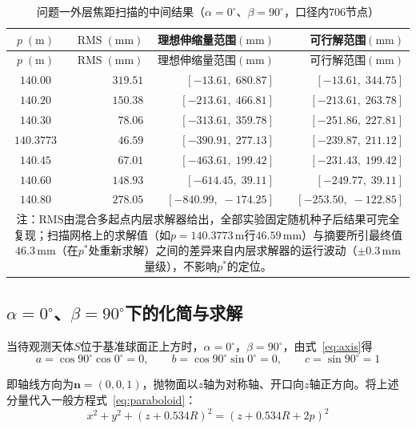 \documentclass[withoutpreface]{cumcmthesis}
\begin{document}
\begin{longtable}{c r r r}
\caption{问题一外层焦距扫描的中间结果（$\alpha=0^{\circ}$、$\beta=90^{\circ}$，口径内$706$节点）} \label{tab:p_scan} \\
\toprule
$p\;(\mathrm{m})$ & $\mathrm{RMS}\;(\mathrm{mm})$ & 理想伸缩量范围$(\mathrm{mm})$ & 可行解范围$(\mathrm{mm})$ \\
\midrule
\endfirsthead
\toprule
$p\;(\mathrm{m})$ & $\mathrm{RMS}\;(\mathrm{mm})$ & 理想伸缩量范围$(\mathrm{mm})$ & 可行解范围$(\mathrm{mm})$ \\
\midrule
\endhead
\bottomrule
\endfoot
\bottomrule
\endlastfoot
$140.00$ & $319.51$ & $[-13.61,\;680.87]$ & $[-13.61,\;344.75]$ \\
$140.20$ & $150.38$ & $[-213.61,\;466.81]$ & $[-213.61,\;263.78]$ \\
$140.30$ & $78.06$ & $[-313.61,\;359.78]$ & $[-251.86,\;227.81]$ \\
$\mathbf{140.3773}$ & $\mathbf{46.59}$ & $[-390.91,\;277.13]$ & $[-239.87,\;211.12]$ \\
$140.45$ & $67.01$ & $[-463.61,\;199.42]$ & $[-231.43,\;199.42]$ \\
$140.60$ & $148.93$ & $[-614.45,\;39.11]$ & $[-249.77,\;39.11]$ \\
$140.80$ & $278.05$ & $[-840.99,\;-174.25]$ & $[-253.50,\;-122.85]$ \\
\midrule
\multicolumn{4}{p{12.8cm}}{\small 注：$\mathrm{RMS}$由混合多起点内层求解器给出，全部实验固定随机种子后结果可完全复现；扫描网格上的求解值（如$p=140.3773\,\mathrm{m}$行$46.59\,\mathrm{mm}$）与摘要所引最终值$46.3\,\mathrm{mm}$（在$p^{*}$处重新求解）之间的差异来自内层求解器的运行波动（$\pm0.3\,\mathrm{mm}$量级），不影响$p^{*}$的定位。}\\
\bottomrule
\end{longtable}

\subsection{$\alpha=0^{\circ}$、$\beta=90^{\circ}$下的化简与求解}

当待观测天体$S$位于基准球面正上方时，$\alpha=0^{\circ}$，$\beta=90^{\circ}$，由式~\eqref{eq:axis}得
\begin{equation}
a=\cos90^{\circ}\cos0^{\circ}=0,\qquad b=\cos90^{\circ}\sin0^{\circ}=0,\qquad c=\sin90^{\circ}=1
\end{equation}

即轴线方向为$\mathbf{n}=(0,0,1)$，抛物面以$z$轴为对称轴、开口向$z$轴正方向。将上述分量代入一般方程式~\eqref{eq:paraboloid}：
\begin{equation}
x^{2}+y^{2}+(z+0.534R)^{2}=(z+0.534R+2p)^{2}
\end{equation}
\end{document}
